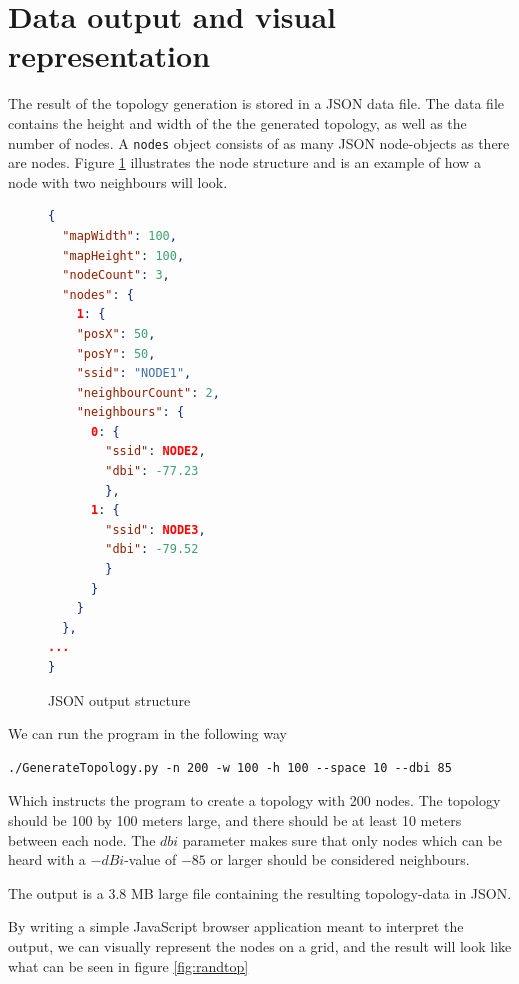 			\section{Data output and visual representation} \label{simulationrep}
			The result of the topology generation is stored in a JSON\cite{JSON} data file. The data file contains the height and width of the the generated topology, as well
			as the number of nodes. A \verb|nodes| object consists of as many JSON node-objects as there are nodes. Figure \ref{fig:nodeStruct} illustrates the node structure
			and is an example of how a node with two neighbours will look.
			\begin{figure}[H]
			\begin{minipage}{\linewidth}
			\begin{lstlisting}[language=json]
{
  "mapWidth": 100,
  "mapHeight": 100,
  "nodeCount": 3,
  "nodes": {
    1: {
    "posX": 50,
    "posY": 50, 
    "ssid": "NODE1", 
    "neighbourCount": 2, 
    "neighbours": {
      0: {
        "ssid": NODE2,
        "dbi": -77.23
        },
      1: {
        "ssid": NODE3,
        "dbi": -79.52
        }
      }
    }
  },
...
}
\end{lstlisting}
\end{minipage}
\caption{JSON output structure}
\label{fig:nodeStruct}

\end{figure}
We can run the program in the following way
\begin{verbatim}./GenerateTopology.py -n 200 -w 100 -h 100 --space 10 --dbi 85 \end{verbatim}
Which instructs the program to create a topology with 200 nodes. 
The topology should be 100 by 100 meters large, and there should be at least 10 meters
between each node. The $dbi$ parameter makes sure that only nodes which can be
heard with a $-dBi$-value of $-85$ or larger should be considered neighbours.

The output is a 3.8 MB large file containing the resulting topology-data in JSON.

By writing a simple JavaScript browser application meant to interpret the output, we can
visually represent the nodes on a grid, and the result will look like what can be seen in figure \ref{fig:randtop}

